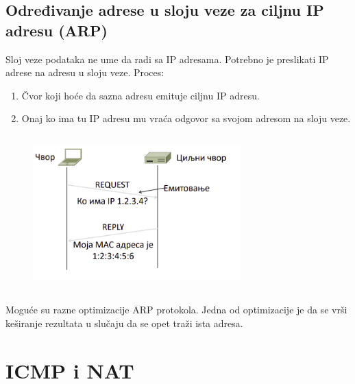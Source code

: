 \documentclass[a4paper]{article}
\begin{document}
    \subsection{Određivanje adrese u sloju veze za ciljnu IP adresu (ARP)}
        Sloj veze podataka ne ume da radi sa IP adresama. Potrebno je preslikati IP adrese 
        na adresu u sloju veze. Proces:
        \begin{enumerate}
            \item Čvor koji hoće da sazna adresu emituje ciljnu IP adresu.
            \item Onaj ko ima tu IP adresu mu vraća odgovor sa svojom adresom na sloju veze.
        \end{enumerate}
        \begin{figure}[H]
            \begin{center}
                \includegraphics[width=80mm,height=60mm]{Slike/arp.png}
            \end{center}
        \end{figure}
        Moguće su razne optimizacije ARP protokola. Jedna od optimizacije je da se 
        vrši keširanje rezultata u slučaju da se opet traži ista adresa.
        
\section{ICMP i NAT}
\end{document}
